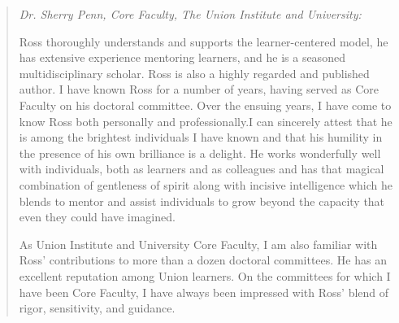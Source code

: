 \documentclass[10pt,DIV09,letterpaper,oneside,headsepline]{scrreprt}
\begin{document}
\begin{quotation}

\textit{Dr. Sherry Penn, Core Faculty, The Union Institute and University:\\}

Ross thoroughly understands and supports the learner-centered model, he has extensive experience mentoring learners, and he is a seasoned multidisciplinary scholar. Ross is also a highly regarded and published author. I have known Ross for a number of years, having served as Core Faculty on his doctoral committee. Over the ensuing years, I have come to know Ross both personally and professionally.I can sincerely attest that he is among the brightest individuals I have known and that his humility in the presence of his own brilliance is a delight. He works wonderfully well with individuals, both as learners and as colleagues and has that magical combination of gentleness of spirit along with incisive intelligence which he blends to mentor and assist individuals to grow beyond the capacity that even they could have imagined.

As Union Institute and University Core Faculty, I am also familiar with Ross' contributions to more than a dozen doctoral committees. He has an excellent reputation among Union learners. On the committees for which I have been Core Faculty, I have always been impressed with Ross' blend of rigor, sensitivity, and guidance.
\end{quotation}
\bigskip
\end{document}
